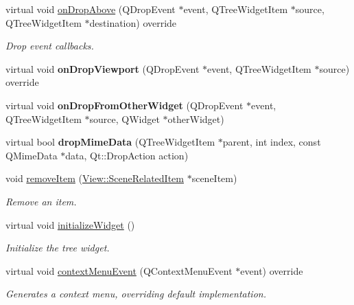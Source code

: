 \begin{Indent}
\begin{DoxyCompactItemize}
virtual void \mbox{\hyperlink{classrev_1_1_view_1_1_scene_tree_widget_acaadcd306b95e0f6a09472b2a195863b}{on\+Drop\+Above}} (Q\+Drop\+Event $\ast$event, Q\+Tree\+Widget\+Item $\ast$source, Q\+Tree\+Widget\+Item $\ast$destination) override
\begin{DoxyCompactList}\small\item\em Drop event callbacks. \end{DoxyCompactList}\item 
\mbox{\label{classrev_1_1_view_1_1_scene_tree_widget_a4935254c32dbf371f1cf6c7dd464b512}} 
virtual void {\bfseries on\+Drop\+Viewport} (Q\+Drop\+Event $\ast$event, Q\+Tree\+Widget\+Item $\ast$source) override
\item 
\mbox{\label{classrev_1_1_view_1_1_scene_tree_widget_a0dbd6a6ad1cab40f4d08fd00b3896b9d}} 
virtual void {\bfseries on\+Drop\+From\+Other\+Widget} (Q\+Drop\+Event $\ast$event, Q\+Tree\+Widget\+Item $\ast$source, Q\+Widget $\ast$other\+Widget)
\item 
\mbox{\label{classrev_1_1_view_1_1_scene_tree_widget_acad4e7feada024a7dd726820c048da6c}} 
virtual bool {\bfseries drop\+Mime\+Data} (Q\+Tree\+Widget\+Item $\ast$parent, int index, const Q\+Mime\+Data $\ast$data, Qt\+::\+Drop\+Action action)
\item 
\mbox{\label{classrev_1_1_view_1_1_scene_tree_widget_a2dd2428573329cb7a56a3b8e151cecc6}} 
void \mbox{\hyperlink{classrev_1_1_view_1_1_scene_tree_widget_a2dd2428573329cb7a56a3b8e151cecc6}{remove\+Item}} (\mbox{\hyperlink{classrev_1_1_view_1_1_scene_related_item}{View\+::\+Scene\+Related\+Item}} $\ast$scene\+Item)
\begin{DoxyCompactList}\small\item\em Remove an item. \end{DoxyCompactList}\item 
\mbox{\label{classrev_1_1_view_1_1_scene_tree_widget_ae9b055e90b2f3163ff1b3552fc63b7e2}} 
virtual void \mbox{\hyperlink{classrev_1_1_view_1_1_scene_tree_widget_ae9b055e90b2f3163ff1b3552fc63b7e2}{initialize\+Widget}} ()
\begin{DoxyCompactList}\small\item\em Initialize the tree widget. \end{DoxyCompactList}\item 
virtual void \mbox{\hyperlink{classrev_1_1_view_1_1_scene_tree_widget_a262a8da9d0d6dd99cad8412030dfe1bb}{context\+Menu\+Event}} (Q\+Context\+Menu\+Event $\ast$event) override
\begin{DoxyCompactList}\small\item\em Generates a context menu, overriding default implementation. \end{DoxyCompactList}\end{DoxyCompactItemize}
\end{Indent}
